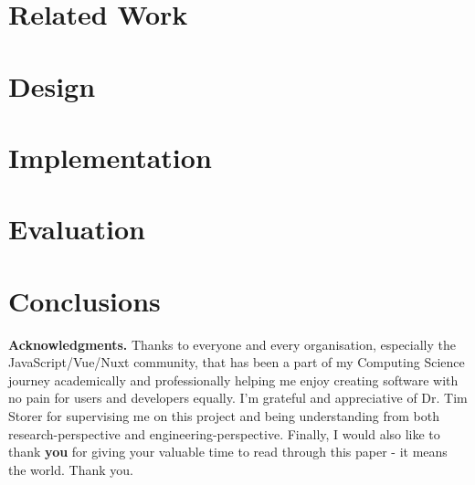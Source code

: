 \documentclass{mpaper}
\begin{document}
\section{Related Work}\label{sec:RelatedWork}


\section{Design}\label{sec:Design}


\section{Implementation}\label{sec:Implementation}


\section{Evaluation}\label{sec:Evaluation}


\section{Conclusions}\label{sec:Conclusion}



\vskip8pt \noindent
{\bf Acknowledgments.}
Thanks to everyone and every organisation, especially the JavaScript/Vue/Nuxt community, that has been a part of my Computing Science journey academically and professionally helping me enjoy creating software with no pain for users and developers equally. I'm grateful and appreciative of Dr. Tim Storer for supervising me on this project and being understanding from both research-perspective and engineering-perspective. Finally, I would also like to thank \textbf{you} for giving your valuable time to read through this paper - it means the world. Thank you.

\renewcommand{\bibsection}{\section*{REFERENCES}}
\setlength{\bibsep}{5pt}

{%

}
\end{document}

